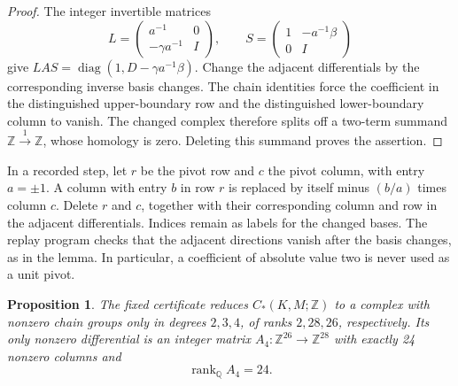 \documentclass[11pt]{amsart}
\newtheorem{proposition}[theorem]{Proposition}
\newcommand{\Z}{\mathbb Z}
\newcommand{\Q}{\mathbb Q}
\newcommand{\rank}{\operatorname{rank}}
\begin{document}
\begin{proof}
The integer invertible matrices
\[
 L=\begin{pmatrix}a^{-1}&0\\-\gamma a^{-1}&I\end{pmatrix},\qquad
 S=\begin{pmatrix}1&-a^{-1}\beta\\0&I\end{pmatrix}
\]
give $LAS=\operatorname{diag}(1,D-\gamma a^{-1}\beta)$.
Change the adjacent differentials by the corresponding inverse basis
changes. The chain identities force the coefficient in the distinguished
upper-boundary row and the distinguished lower-boundary column to vanish.
The changed complex therefore splits off a two-term summand
$\Z\xrightarrow{1}\Z$, whose homology is zero.
Deleting this summand proves the assertion.
\end{proof}

In a recorded step, let $r$ be the pivot row and $c$ the pivot column,
with entry $a=\pm1$. A column with entry $b$ in row $r$ is replaced by
itself minus $(b/a)$ times column $c$. Delete $r$ and $c$, together with
their corresponding column and row in the adjacent differentials.
Indices remain as labels for the changed bases. The replay program checks
that the adjacent directions vanish after the basis changes, as in the
lemma. In particular, a coefficient of absolute value two is never used
as a unit pivot.

\begin{proposition}\label{prop:finite}
The fixed certificate reduces $C_*(K,M;\Z)$ to a complex with nonzero
chain groups only in degrees $2,3,4$, of ranks $2,28,26$, respectively.
Its only nonzero differential is an integer matrix
$A_4:\Z^{26}\to\Z^{28}$ with exactly 24 nonzero columns and
\[
 \rank_{\Q} A_4=24.
\]
\end{proposition}
\end{document}
